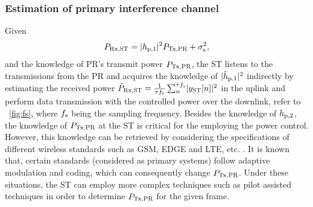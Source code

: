 \subsubsection{Estimation of primary interference channel}
Given 
\begin{equation}
P_{\text{Rx,ST}} = |h_{\text{p,1}}|^2 P_{\text{Tx,PR}} + \sigma^2_{\text{s}} \label{eq:prcvd}, 
\end{equation}
and the knowledge of PR's transmit power $P_{\text{Tx,PR}}$, the ST listens to the transmissions from the PR and acquires the knowledge of $|\hat{h}_{\text{p,1}}|^2$ indirectly by estimating the received power $\hat{P}_{\text{Rx,ST}} = {\frac{1}{{\tau f_{\text{s}}}}\sum_n^{\tau f_{\text{s}}}} { |y_{\text{ST}}[n]|^2}$ in the uplink and perform data transmission with the controlled power over the downlink, refer to \figurename~\ref{fig:fs}, where $f_{\text{s}}$ being the sampling frequency. Besides the knowledge of $h_{\text{p,2}}$, the knowledge of $P_{\text{Tx,PR}}$ at the ST is critical for the employing the power control. However, this knowledge can be retrieved by considering the specifications of different wireless standards such as GSM, EDGE and LTE, etc. \cite{Sharma14}. It is known that, certain standards (considered as primary systems) follow adaptive modulation and coding, which can consequently change $P_{\text{Tx,PR}}$. Under these situations, the ST can employ more complex techniques such as pilot assisted techniques in order to determine $P_{\text{Tx,PR}}$ for the given frame.%

